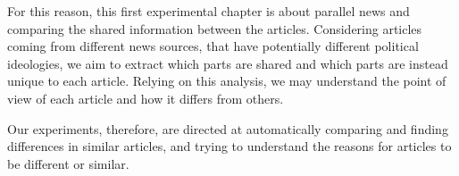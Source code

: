 For this reason, this first experimental chapter is about parallel news and comparing the shared information between the articles.
Considering articles coming from different news sources, that have potentially different political ideologies, we aim to extract which parts are shared and which parts are instead unique to each article.
Relying on this analysis, we may understand the point of view of each article and how it differs from others.

Our experiments, therefore, are directed at automatically comparing and finding differences in similar articles, and trying to understand the reasons for articles to be different or similar.

